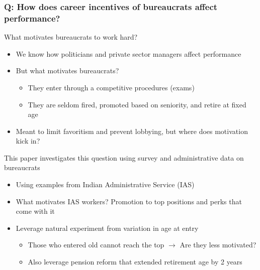 \documentclass[aspectratio=169]{beamer}
\begin{document}
\begin{frame}
\frametitle{Q: How does career incentives of bureaucrats affect performance?}
What motivates bureaucrats to work hard?
\begin{itemize}\setlength\itemsep{3pt}
\item We know how politicians and private sector managers affect performance
\item But what motivates bureaucrats?
\begin{itemize}\setlength\itemsep{3pt}
\item They enter through a competitive procedures (exams)
\item They are seldom fired, promoted based on seniority, and retire at fixed age
\end{itemize}
\item Meant to limit favoritism and prevent lobbying, but where does motivation kick in?
\end{itemize}\medskip
This paper investigates this question using survey and administrative data on bureaucrats
\begin{itemize}\setlength\itemsep{3pt}
\item Using examples from Indian Administrative Service (IAS)
\item What motivates IAS workers? Promotion to top positions and perks that come with it
\item Leverage natural experiment from variation in age at entry
\begin{itemize}\setlength\itemsep{3pt}
\item Those who entered old cannot reach the top $\to$ Are they less motivated?
\item Also leverage pension reform that extended retirement age by 2 years
\end{itemize}
\end{itemize}
\end{frame}
\end{document}
